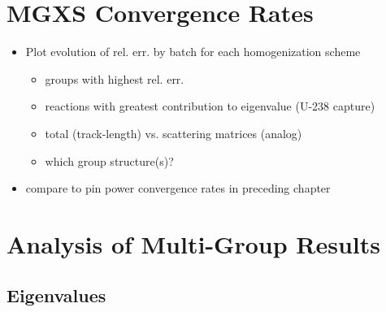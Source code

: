 \section{MGXS Convergence Rates}

\begin{itemize}[noitemsep]
  \item Plot evolution of rel. err. by batch for each homogenization scheme
  \begin{itemize}[noitemsep]
    \item groups with highest rel. err.
    \item reactions with greatest contribution to eigenvalue (U-238 capture)
    \item total (track-length) vs. scattering matrices (analog)    
    \item which group structure(s)?
 \end{itemize}
  \item compare to pin power convergence rates in preceding chapter
\end{itemize}


\section{Analysis of Multi-Group Results}
\label{sec:chap8-mg-results}


\subsection{Eigenvalues}
\label{subsec:chap8-eigenvalues}

